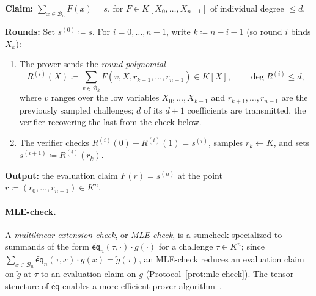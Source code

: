 \documentclass{article}
\theoremstyle{definition}
\newcommand*{\mle}{\widetilde}
\newcommand{\eq}{\mathsf{eq}}
\newcommand{\BB}{\mathcal{B}}
\begin{document}
\begin{protocol}[Sumcheck]
\label{prot:sumcheck}
\textbf{Claim:} $\sum_{x \in \BB_n} F(x) = s$, for $F \in K[X_0, \ldots, X_{n - 1}]$ of individual degree $\le d$.

\textbf{Rounds:} Set $s^{(0)} \coloneqq s$. For $i = 0, \ldots, n - 1$, write $k \coloneqq n - i - 1$ (so round $i$ binds $X_k$):
\begin{enumerate}
\item The prover sends the \emph{round polynomial}
\[
  R^{(i)}(X) \coloneqq \sum_{v \in \BB_k} F(v, X, r_{k + 1}, \ldots, r_{n - 1}) \in K[X], \qquad \deg R^{(i)} \le d,
\]
where $v$ ranges over the low variables $X_0, \ldots, X_{k - 1}$ and $r_{k + 1}, \ldots, r_{n - 1}$ are the previously sampled challenges; $d$ of its $d + 1$ coefficients are transmitted, the verifier recovering the last from the check below.
\item The verifier checks $R^{(i)}(0) + R^{(i)}(1) = s^{(i)}$, samples $r_k \gets K$, and sets $s^{(i + 1)} \coloneqq R^{(i)}(r_k)$.
\end{enumerate}

\textbf{Output:} the evaluation claim $F(r) = s^{(n)}$ at the point $r \coloneqq (r_0, \ldots, r_{n - 1}) \in K^n$.
\end{protocol}

\paragraph{MLE-check.}
A \emph{multilinear extension check}, or \emph{MLE-check}, is a sumcheck specialized to summands of the form $\mle{\eq}_n(\tau, \cdot) \cdot g(\cdot)$ for a challenge $\tau \in K^n$; since $\sum_{x \in \BB_n} \mle{\eq}_n(\tau, x) \cdot g(x) = \mle{g}(\tau)$, an MLE-check reduces an evaluation claim on $\mle{g}$ at $\tau$ to an evaluation claim on $g$ (Protocol~\ref{prot:mle-check}). The tensor structure of $\mle{\eq}$ enables a more efficient prover algorithm~\cite[\S 3]{Gruen:2024aa}.
\end{document}

